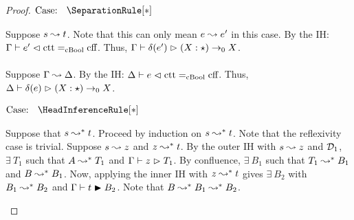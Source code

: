 \begin{proof}
    $\text{Case: }\begin{array}{c} \SeparationRule[*] \end{array}$
    \begin{proofcase}
        Suppose $s \leadsto t$.
        Note that this can only mean $e \leadsto e^\prime$ in this case.
        By the IH: $\Gamma \vdash e^\prime \vartriangleleft \text{ctt} =_{\text{cBool}} \text{cff}$.
        Thus, $\Gamma \vdash \delta(e^\prime) \vartriangleright (X : \star) \to_0 X$.
        \\ \\
        Suppose $\Gamma \leadsto \Delta$.
        By the IH: $\Delta \vdash e \vartriangleleft \text{ctt} =_{\text{cBool}} \text{cff}$.
        Thus, $\Delta \vdash \delta(e) \vartriangleright (X : \star) \to_0 X$.
    \end{proofcase}

    $\text{Case: }\begin{array}{c} \HeadInferenceRule[*] \end{array}$
    \begin{proofcase}
        Suppose that $s \leadsto^* t$.
        Proceed by induction on $s \leadsto^* t$.
        Note that the reflexivity case is trivial.
        Suppose $s \leadsto z$ and $z \leadsto^* t$.
        By the outer IH with $s \leadsto z$ and $\mathcal{D}_{1}$, $\exists\ T_1$ such that $A \leadsto^* T_1$ and $\Gamma \vdash z \vartriangleright T_1$.
        By confluence, $\exists\ B_1$ such that $T_1 \leadsto^* B_1$ and $B \leadsto^* B_1$.
        Now, applying the inner IH with $z \leadsto^* t$ gives $\exists\ B_2$ with $B_1 \leadsto^* B_2$ and $\Gamma \vdash t \blacktriangleright B_2$.
        Note that $B \leadsto^* B_1 \leadsto^* B_2$.
    \end{proofcase}


\end{proof}
